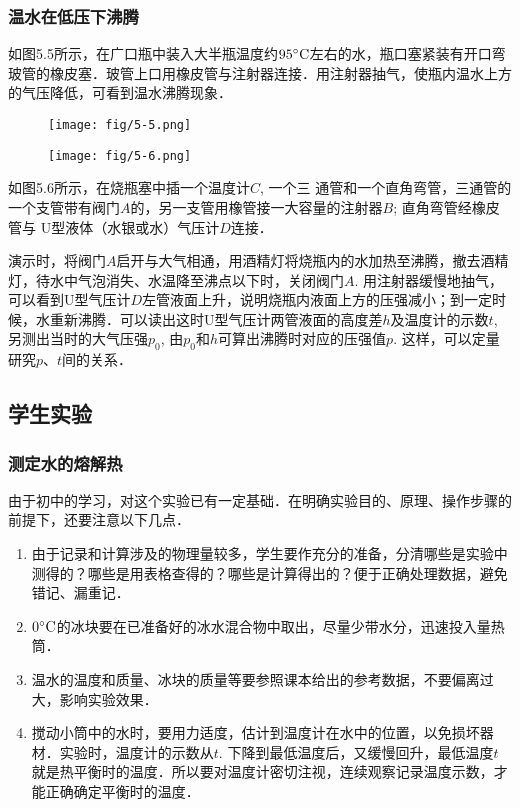 \subsubsection{温水在低压下沸腾}
如图5.5所示，在广口瓶中装入大半瓶温度约$95^{\circ}{\rm C}$左右的水，瓶口塞紧装有开口弯玻管的橡皮塞．玻管上口用橡皮管与注射器连接．用注射器抽气，使瓶内温水上方的气压降低，可看到温水沸腾现象．
\begin{figure}[htp]\centering
    \begin{minipage}[t]{0.48\textwidth}
    \centering
\texttt{[image: fig/5-5.png]}
    \caption{}
    \end{minipage}
    \begin{minipage}[t]{0.48\textwidth}
    \centering
\texttt{[image: fig/5-6.png]}
    \caption{}
    \end{minipage}
    \end{figure}

如图5.6所示，在烧瓶塞中插一个温度计$C$, 一个三
通管和一个直角弯管，三通管的一个支管带有阀门$A$的，另一支管用橡管接一大容量的注射器$B$; 直角弯管经橡皮管与
U型液体（水银或水）气压计$D$连接．

演示时，将阀门$A$启开与大气相通，用酒精灯将烧瓶内的水加热至沸腾，撤去酒精灯，待水中气泡消失、水温降至沸点以下时，关闭阀门$A$. 用注射器缓慢地抽气，可以看到U型气压计$D$左管液面上升，说明烧瓶内液面上方的压强减小；到一定时候，水重新沸腾．可以读出这时U型气压计两管液面的高度差$h$及温度计的示数$t$, 另测出当时的大气压强$p_0$, 由$p_0$和$h$可算出沸腾时对应的压强值$p$. 这样，可以定量研究$p$、$t$间的关系．

\subsection{学生实验}
\subsubsection{测定水的熔解热}

由于初中的学习，对这个实验已有一定基础．在明确实验目的、原理、操作步骤的前提下，还要注意以下几点．
\begin{enumerate}
\item 由于记录和计算涉及的物理量较多，学生要作充分的准备，分清哪些是实验中测得的？哪些是用表格查得的？哪些是计算得出的？便于正确处理数据，避免错记、漏重记．
\item $0^{\circ}{\rm C}$的冰块要在已准备好的冰水混合物中取出，尽量少带水分，迅速投入量热筒．
\item 温水的温度和质量、冰块的质量等要参照课本给出的参考数据，不要偏离过大，影响实验效果．
\item 搅动小筒中的水时，要用力适度，估计到温度计在水中的位置，以免损坏器材．实验时，温度计的示数从$t$. 下降到最低温度后，又缓慢回升，最低温度$t$就是热平衡时的温度．所以要对温度计密切注视，连续观察记录温度示数，才能正确确定平衡时的温度．
\end{enumerate}

